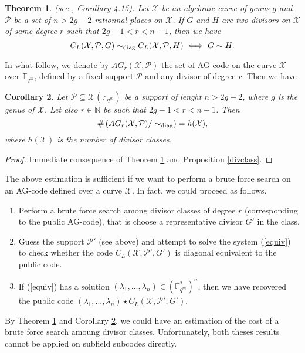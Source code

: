 \documentclass[10pt]{article}
\newtheorem{thm}{Theorem}
\newtheorem{coro1}[thm]{Corollary}
\newcommand{\s}{\vspace{0.3cm}}
\newcommand{\N}{\mathbb{N}}
\newcommand{\fqm}{\mathbb{F}_{q^m}}
\newcommand{\su}{\subseteq}
\newcommand{\X}{\mathcal{X}}
\newcommand{\PR}{\mathcal{P}}
\begin{document}
\s

\begin{thm} \label{thmequiv} \rm (see \cite{CMRP}, Corollary 4.15). \it
Let $\X$ be an algebraic curve of genus $g$ and $\PR$ be a set of $n>2g-2$ rationnal places on $\X$. If $G$ and $H$ are two divisors on $\X$ of same degree $r$ such that $2g-1 < r < n-1$, then we have 
\[C_L(\X,\PR,G) \sim_{\rm diag} C_L(\X,\PR,H) \iff G \sim H.\]
\end{thm}

\s

In what follow, we denote by $AG_r(\X,\PR)$ the set of AG-code on the curve $\X$ over $\fqm$, defined by a fixed support $\PR$ and any divisor of degree $r$. Then we have 

\s

\begin{coro1} \label{nbAGr}
Let $\PR \su \X(\fqm)$ be a support of lenght $n > 2g+2$, where $g$ is the genus of $\X$. Let also $r \in \N$ be such that $2g-1 < r < n-1$. Then 
\[ \#\left(AG_r(\X,\PR)/ \sim_{\rm diag}\right) \it = h(\X),\]
where $h(\X)$ is the number of divisor classes.
\end{coro1}

\s

\begin{proof}
Immediate consequence of Theorem \ref{thmequiv} and Proposition \ref{divclass}.
\end{proof}

\s

The above estimation is sufficient if we want to perform a brute force search on an AG-code defined over a curve $\X$. In fact, we could proceed as follows.
\begin{enumerate}
\item Perform a brute force search among divisor classes of degree $r$ (corresponding to the public AG-code), that is choose a representative divisor $G'$ in the class.
\item Guess the support $\PR'$ (see above) and attempt to solve the system (\ref{equiv}) to check whether the code $C_L(\X,\PR',G')$ is diagonal equivalent to the public code.
\item If (\ref{equiv}) has a solution $(\lambda_1,...,\lambda_n) \in (\fqm^*)^n$, then we have recovered the public code $(\lambda_1,...,\lambda_n) \star C_L(\X,\PR',G')$.
\end{enumerate}

By Theorem \ref{thmequiv} and Corollary \ref{nbAGr}, we could have an estimation of the cost of a brute force search amoung divisor classes. Unfortunately, both theses results cannot be applied on subfield subcodes directly.
\end{document}
